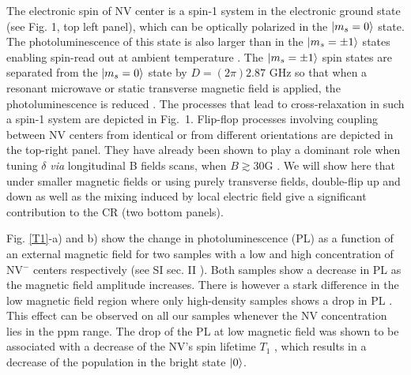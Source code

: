 \documentclass[preprintnumbers,amsmath,amssymb,superscriptaddress,twocolumn,showpacs]{revtex4-2}
\begin{document}
The electronic spin of NV center is a spin-1 system in the electronic ground state (see Fig. 1, top left panel), which can be optically polarized in the $\ket{m_s=0}$ state. The photoluminescence of this state is also larger than in the $\ket{m_s=\pm 1}$ states enabling spin-read out at ambient temperature \cite{DOHERTY20131}. The $\ket{m_s=\pm 1}$ spin states are separated from the $\ket{m_s=0}$ state by  $D = (2\pi) 2.87$ GHz so that when a resonant microwave or static transverse magnetic field is applied, the photoluminescence is reduced \citep{epstein2005anisotropic,lai2009influence}.  The processes that lead to cross-relaxation in such a spin-1 system are depicted in Fig.~1. Flip-flop processes involving coupling between NV centers from identical or from different orientations are depicted in the top-right panel. They have already been shown to play a dominant role when tuning $\delta$ {\it via} longitudinal B fields scans, when $B \gtrsim 30$G \cite{choi_observation_2017}. We will show here that under smaller magnetic fields or using purely transverse fields, double-flip up and down as well as the mixing induced by local electric field give a significant contribution to the CR (two bottom panels). 

Fig.  \ref{T1}-a) and b) show the change in photoluminescence (PL) as a function of an external magnetic field for two samples with a low and high concentration of NV$^-$ centers respectively (see SI sec. II \citep{SI_low_filed_CR} \nocite{anishchik2015low, filimonenko2020weak, van1990electric}). Both samples show a decrease in PL as the magnetic field amplitude increases.  There is however a stark difference in the low magnetic field region where only high-density samples shows a drop in PL \citep{jarmola_longitudinal_2015,  mrozek_longitudinal_2015}. This effect can be observed on all our samples whenever the NV concentration lies in the ppm range. The drop of the PL at low magnetic field was shown to be associated with a decrease of the NV's spin lifetime $T_1$ \citep{jarmola_temperature-_2012}, which results in a decrease of the population in the bright state $\ket{0}$.
\end{document}
